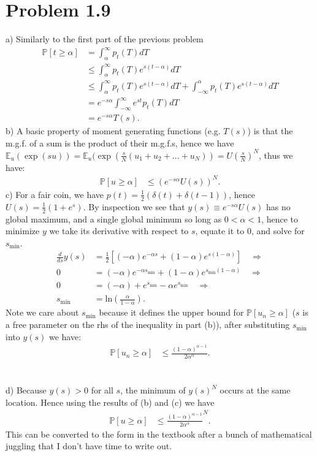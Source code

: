 \documentclass[11pt,letterpaper]{article}
\newcommand{\p}[0]{\mathbb{P}}
\newcommand{\e}[0]{\mathbb{E}}
\begin{document}
\section*{Problem 1.9}

a) Similarly to the first part of the previous problem
\begin{align*}
\p[t \ge \alpha] &= \int_\alpha^\infty p_t(T) dT \\
&\le \int_\alpha^\infty p_t(T) e^{s(t - \alpha)} dT \\
&\le \int_\alpha^\infty p_t(T) e^{s(t - \alpha)} dT + \int_{-\infty}^\alpha p_t(T) e^{s(t - \alpha)} dT \\
&= e^{-s \alpha} \int_{-\infty}^\infty e^{st} p_t(T) dT \\
&= e^{-s \alpha} T(s).
\end{align*}
b) A basic property of moment generating functions (e.g. $T(s)$) is that the m.g.f. of a sum is the product of their m.g.f.s, hence we have $\e_u(\exp(su)) = \e_u(\exp(\frac{s}{N}(u_1 + u_2 + ... + u_N)) = U(\frac{s}{N})^N$, thus we have:
\begin{align*}
    \p[u \ge \alpha] &\le (e^{-s\alpha} U(s))^N.
\end{align*}
c) For a fair coin, we have $p(t) = \frac{1}{2}(\delta(t) + \delta(t - 1))$, hence $U(s) = \frac{1}{2}(1 + e^s)$. By inspection we see that $y(s) \equiv e^{-s\alpha}U(s)$ has no global maximum, and a single global minimum so long as $0 < \alpha < 1$, hence to minimize $y$ we take its derivative with respect to $s$, equate it to 0, and solve for $s_\textrm{min}$.
\begin{align*}
    \frac{d}{ds} y(s) &= \frac{1}{2}[(-\alpha)e^{-\alpha s} + (1 - \alpha)e^{s(1 - \alpha)}] \quad \Longrightarrow \\
    0 &= (-\alpha)e^{-\alpha s_\textrm{min}} + (1 - \alpha)e^{s_\textrm{min}(1 - \alpha)} \quad \Longrightarrow \\
    0 &= (-\alpha) + e^{s_\textrm{min}} - \alpha e^{s_\textrm{min}} \quad \Longrightarrow \\
    s_\textrm{min} &= \textrm{ln}\left(\frac{\alpha}{1 - \alpha}\right).
\end{align*}
Note we care about $s_\textrm{min}$ because it defines the upper bound for $\p[u_n \ge \alpha]$ ($s$ is a free parameter on the rhs of the inequality in part (b)), after substituting $s_\textrm{min}$ into $y(s)$ we have:
\begin{align*}
    \p[u_n \ge \alpha] &\le \frac{(1 - \alpha)^{\alpha - 1}}{2 \alpha^\alpha}.
\end{align*}
\\\\
d) Because $y(s) > 0$ for all $s$, the minimum of $y(s)^N$ occurs at the same location.  Hence using the results of (b) and (c) we have
\begin{align*}
    \p[u \ge \alpha] &\le \frac{(1 - \alpha)^{\alpha - 1}}{2 \alpha^\alpha}^N.
\end{align*}
This can be converted to the form in the textbook after a bunch of mathematical juggling that I don't have time to write out.
\end{document}
